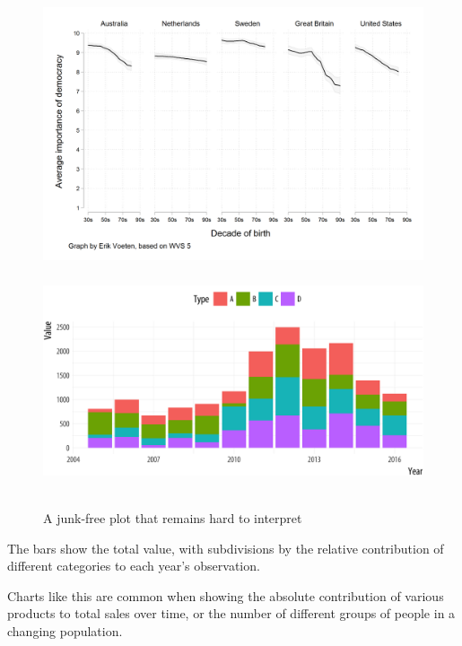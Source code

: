 \documentclass[11pt]{beamer}
\begin{document}
\begin{frame}
	
	\frametitle{\bfseries}
	\begin{figure}
		\vspace{-1em}
		\includegraphics[width=1\linewidth]{Figure/democracy-voeten-version-2}
	\end{figure}
	\begin{itemize}
		
	\end{itemize}
\end{frame}
\begin{frame}
	
	\frametitle{\bfseries}
	\begin{figure}
		\vspace{-.5em}
		\includegraphics[width=0.8\linewidth]{Figure/preception-data-1}
		
		\\
		\tiny{A junk-free plot that remains hard to interpret}
		\label{fig:anscombe-1}
	\end{figure}
	\begin{itemize}
		\footnotesize{
			\item The bars show the total value, with subdivisions by the relative contribution of different categories to each year’s observation.
			\item Charts like this are common when showing the absolute contribution of various products to total sales over time, or the number of different groups of people in a changing population.
		}
	\end{itemize}
\end{frame}
\end{document}
